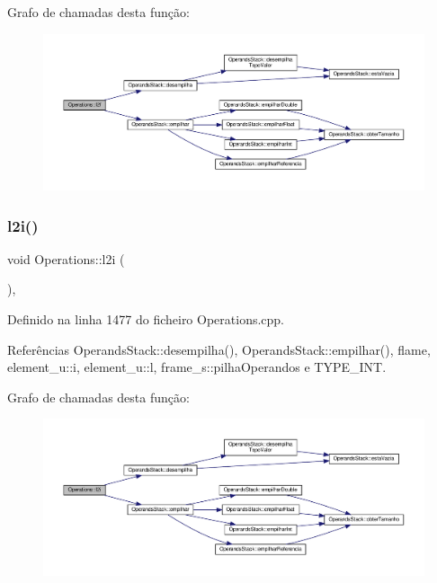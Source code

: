 Grafo de chamadas desta função\+:
\nopagebreak
\begin{figure}[H]
\begin{center}
\leavevmode
\includegraphics[width=350pt]{classOperations_af2064cce9ba6f6a4be257354f21f537e_cgraph}
\end{center}
\end{figure}
\mbox{\label{classOperations_ad5820d99e67f4856e110685b775c5e9b}} 
\subsubsection{\texorpdfstring{l2i()}{l2i()}}
{\footnotesize\ttfamily void Operations\+::l2i (\begin{DoxyParamCaption}{ }\end{DoxyParamCaption})\hspace{0.3cm}{\ttfamily [static]}, {\ttfamily [private]}}



Definido na linha 1477 do ficheiro Operations.\+cpp.



Referências Operands\+Stack\+::desempilha(), Operands\+Stack\+::empilhar(), flame, element\+\_\+u\+::i, element\+\_\+u\+::l, frame\+\_\+s\+::pilha\+Operandos e T\+Y\+P\+E\+\_\+\+I\+NT.

Grafo de chamadas desta função\+:
\nopagebreak
\begin{figure}[H]
\begin{center}
\leavevmode
\includegraphics[width=350pt]{classOperations_ad5820d99e67f4856e110685b775c5e9b_cgraph}
\end{center}
\end{figure}
\mbox{\label{classOperations_ad4b153d687baa98c26fcfe7c24e12f45}} 
